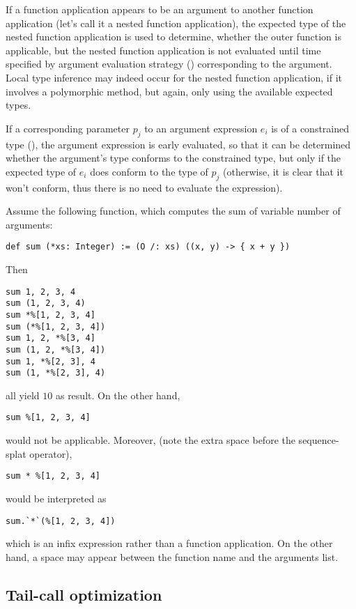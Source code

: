 If a function application appears to be an argument to another function application (let's call it a nested function application), the expected type of the nested function application is used to determine, whether the outer function is applicable, but the nested function application is not evaluated until time specified by argument evaluation strategy () corresponding to the argument. Local type inference may indeed occur for the nested function application, if it involves a polymorphic method, but again, only using the available expected types. 

If a corresponding parameter $p_j$ to an argument expression $e_i$ is of a constrained type (), the argument expression is early evaluated, so that it can be determined whether the argument's type conforms to the constrained type, but only if the expected type of $e_i$ does conform to the type of $p_j$ (otherwise, it is clear that it won't conform, thus there is no need to evaluate the expression). 

\example Assume the following function, which computes the sum of variable number of arguments:
\begin{lstlisting}
def sum (*xs: Integer) := (O /: xs) ((x, y) -> { x + y })
\end{lstlisting}
Then 
\begin{lstlisting}
sum 1, 2, 3, 4
sum (1, 2, 3, 4)
sum *%[1, 2, 3, 4]
sum (*%[1, 2, 3, 4])
sum 1, 2, *%[3, 4]
sum (1, 2, *%[3, 4])
sum 1, *%[2, 3], 4
sum (1, *%[2, 3], 4)
\end{lstlisting}
all yield $10$ as result. On the other hand,
\begin{lstlisting}
sum %[1, 2, 3, 4]
\end{lstlisting}
would not be applicable. Moreover, (note the extra space before the sequence-splat operator),
\begin{lstlisting}
sum * %[1, 2, 3, 4]
\end{lstlisting}
would be interpreted as 
\begin{lstlisting}
sum.`*`(%[1, 2, 3, 4])
\end{lstlisting}
which is an infix expression rather than a function application. On the other hand, a space may appear between the function name and the arguments list.





\subsection{Tail-call optimization}

